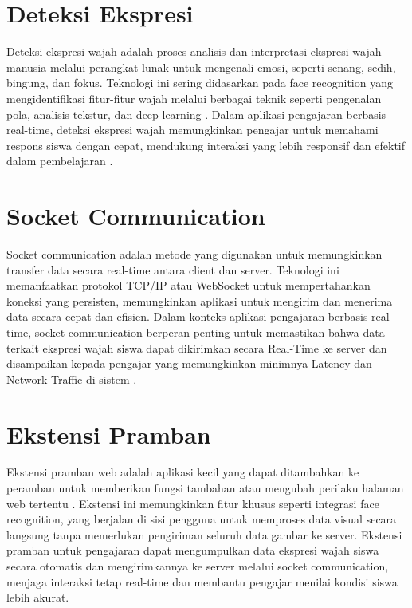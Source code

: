 \section{Deteksi Ekspresi}
Deteksi ekspresi wajah adalah proses analisis dan interpretasi ekspresi wajah manusia melalui perangkat lunak untuk mengenali emosi, seperti senang, sedih, bingung, dan fokus. Teknologi ini sering didasarkan pada face recognition yang mengidentifikasi fitur-fitur wajah melalui berbagai teknik seperti pengenalan pola, analisis tekstur, dan deep learning \cite{archanaRealTimeFace2022}. Dalam aplikasi pengajaran berbasis real-time, deteksi ekspresi wajah memungkinkan pengajar untuk memahami respons siswa dengan cepat, mendukung interaksi yang lebih responsif dan efektif dalam pembelajaran \cite{archanaRealTimeFace2022}.

\section{Socket Communication}
Socket communication adalah metode yang digunakan untuk memungkinkan transfer data secara real-time antara client dan server. Teknologi ini memanfaatkan protokol TCP/IP atau WebSocket untuk mempertahankan koneksi yang persisten, memungkinkan aplikasi untuk mengirim dan menerima data secara cepat dan efisien. Dalam konteks aplikasi pengajaran berbasis real-time, socket communication berperan penting untuk memastikan bahwa data terkait ekspresi wajah siswa dapat dikirimkan secara Real-Time ke server dan disampaikan kepada pengajar yang memungkinkan minimnya Latency dan Network Traffic di sistem \cite{ogundeyiWebSocketRealTime2019}.

\section{Ekstensi Pramban}
Ekstensi pramban web adalah aplikasi kecil yang dapat ditambahkan ke peramban untuk memberikan fungsi tambahan atau mengubah perilaku halaman web tertentu \cite{jinImpactExtensionsBrowser2024}. Ekstensi ini memungkinkan fitur khusus seperti integrasi face recognition, yang berjalan di sisi pengguna untuk memproses data visual secara langsung tanpa memerlukan pengiriman seluruh data gambar ke server. Ekstensi pramban untuk pengajaran dapat mengumpulkan data ekspresi wajah siswa secara otomatis dan mengirimkannya ke server melalui socket communication, menjaga interaksi tetap real-time dan membantu pengajar menilai kondisi siswa lebih akurat.

